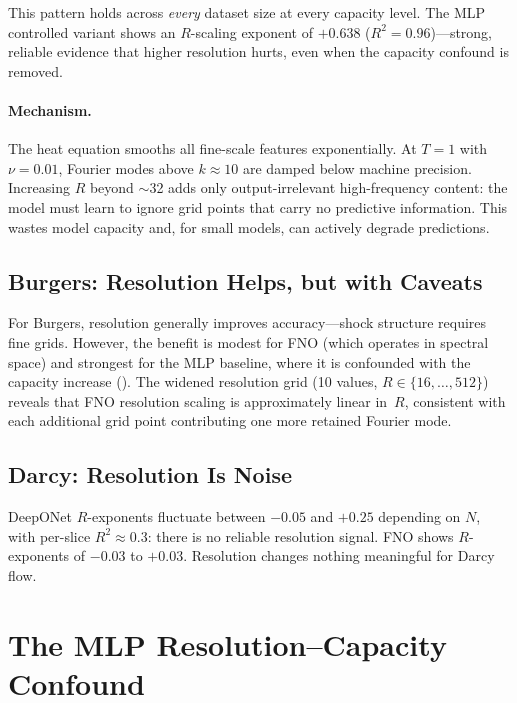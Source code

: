 \documentclass[11pt]{article}
\begin{document}
This pattern holds across \emph{every} dataset size at every
capacity level. The MLP controlled variant shows an $R$-scaling
exponent of $+0.638$ ($R^2 = 0.96$)---strong, reliable evidence
that higher resolution hurts, even when the capacity confound is
removed.

\paragraph{Mechanism.}
The heat equation smooths all fine-scale features exponentially.
At $T = 1$ with $\nu = 0.01$, Fourier modes above $k \approx 10$
are damped below machine precision. Increasing $R$ beyond $\sim$32
adds only output-irrelevant high-frequency content: the model must
learn to ignore grid points that carry no predictive information.
This wastes model capacity and, for small models, can actively
degrade predictions.

\subsection{Burgers: Resolution Helps, but with Caveats}
\label{sec:res-burgers}

For Burgers, resolution generally improves accuracy---shock structure
requires fine grids. However, the benefit is modest for FNO
(which operates in spectral space) and strongest for the MLP baseline,
where it is confounded with the capacity increase
().
The widened resolution grid (10 values, $R \in \{16, \ldots, 512\}$)
reveals that FNO resolution scaling is approximately linear in~$R$,
consistent with each additional grid point contributing one more
retained Fourier mode.

\subsection{Darcy: Resolution Is Noise}
\label{sec:res-darcy}

DeepONet $R$-exponents fluctuate between $-0.05$ and $+0.25$
depending on $N$, with per-slice $R^2 \approx 0.3$: there is no
reliable resolution signal. FNO shows $R$-exponents of $-0.03$ to
$+0.03$. Resolution changes nothing meaningful for Darcy flow.


\section{The MLP Resolution--Capacity Confound}
\label{sec:confound}
\end{document}
